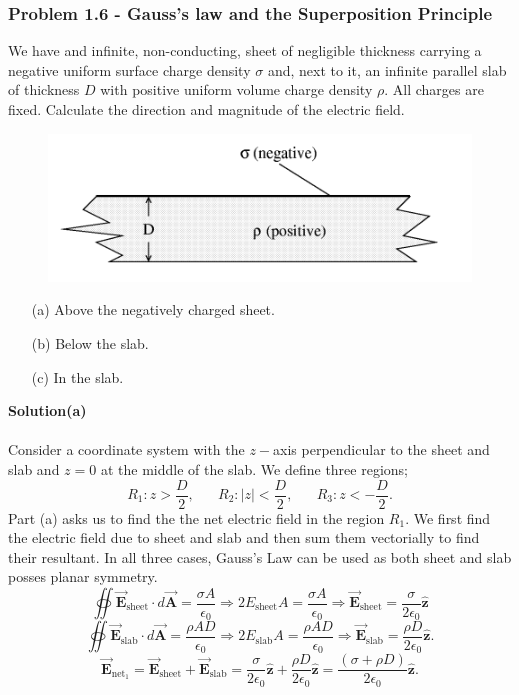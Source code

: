 \documentclass{article}
\begin{document}
\subsubsection*{Problem 1.6 - Gauss's law and the Superposition Principle}
We have and infinite, non-conducting, sheet of negligible thickness carrying a negative uniform surface charge density $\sigma$ and, next to it, an infinite parallel slab of thickness $D$ with positive uniform volume charge density $\rho$. All charges are fixed. Calculate the direction and magnitude of the electric field.
 \begin{figure}[h]
        \centering
        \includegraphics[width=0.5\linewidth]{figs/fig_prob_1.6.png}
    \end{figure}
\begin{enumerate}
    \item[(a)]Above the negatively charged sheet.
    \item[(b)]Below the slab.
    \item[(c)]In the slab.
\end{enumerate}
\textbf{Solution(a)}
\\
\\Consider a coordinate system with the $z-$axis perpendicular to the sheet and slab and $z=0$ at the middle of the slab. We define three regions;
\[R_1: z>\frac{D}{2},\,\,\,\,\,\,\,\,\,\,R_2:|z|<\frac{D}{2},\,\,\,\,\,\,\,\,\,\,R_3:z<-\frac{D}{2}.\]
Part (a) asks us to find the the net electric field in the region $R_1$. We first find the electric field due to sheet and slab and then sum them vectorially to find their resultant. In all three cases, Gauss's Law can be used as both sheet and slab posses planar symmetry. 
\[\oiint\Vec{\boldsymbol{E}}_{\text{sheet}}\cdot d\Vec{\boldsymbol{A}}=\frac{\sigma A}{\epsilon_0}\Rightarrow2E_{\text{sheet}}A=\frac{\sigma A}{\epsilon_0}\Rightarrow\Vec{\boldsymbol{E}}_{\text{sheet}}=\frac{\sigma}{2\epsilon_0}\boldsymbol{\hat{z}}\]
\[\oiint\Vec{\boldsymbol{E}}_{\text{slab}}\cdot d\Vec{\boldsymbol{A}}=\frac{\rho AD}{\epsilon_0}\Rightarrow2E_{\text{slab}}A=\frac{\rho AD}{\epsilon_0}\Rightarrow\Vec{\boldsymbol{E}}_{\text{slab}}=\frac{\rho D}{2\epsilon_0}\boldsymbol{\hat{z}}.\]
\[\Vec{\boldsymbol{E}}_{\text{net}_1}=\Vec{\boldsymbol{E}}_{\text{sheet}}+\Vec{\boldsymbol{E}}_{\text{slab}}=\frac{\sigma}{2\epsilon_0}\boldsymbol{\hat{z}}+\frac{\rho D}{2\epsilon_0}\boldsymbol{\hat{z}}=\frac{(\sigma+\rho D)}{2\epsilon_0}\boldsymbol{\hat{z}}.\]
\end{document}
